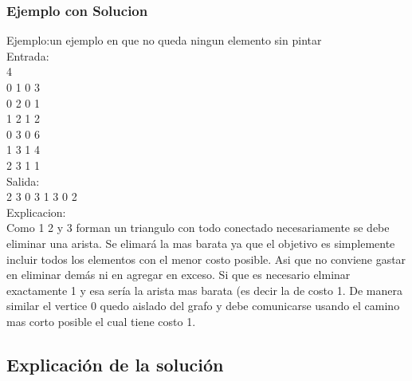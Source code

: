 \subsubsection{Ejemplo con Solucion}
Ejemplo:un ejemplo en que no queda ningun elemento sin pintar\\
Entrada:\\
4\\
0 1 0 3\\
0 2 0 1\\
1 2 1 2\\
0 3 0 6\\
1 3 1 4\\
2 3 1 1\\
Salida:\\
2 3 0 3 1 3 0 2\\
Explicacion:\\
Como 1 2 y 3 forman un triangulo con todo conectado necesariamente se debe eliminar una arista. Se elimará la mas barata ya que el objetivo es simplemente incluir todos los elementos con el menor costo posible. Asi que no conviene gastar en eliminar demás ni en agregar en exceso. Si que es necesario elminar exactamente 1 y esa sería la arista mas barata (es decir la de costo 1. De manera similar el vertice 0 quedo aislado del grafo y debe comunicarse usando el camino mas corto posible el cual tiene costo 1.




\subsection{Explicación de la solución}

